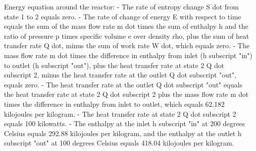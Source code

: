 Energy equation around the reactor:
- The rate of entropy change S dot from state 1 to 2 equals zero.
- The rate of change of energy E with respect to time equals the sum of the mass flow rate m dot times the sum of enthalpy h and the ratio of pressure p times specific volume e over density rho, plus the sum of heat transfer rate Q dot, minus the sum of work rate W dot, which equals zero.
- The mass flow rate m dot times the difference in enthalpy from inlet (h subscript "in") to outlet (h subscript "out"), plus the heat transfer rate at state 2 Q dot subscript 2, minus the heat transfer rate at the outlet Q dot subscript "out", equals zero.
- The heat transfer rate at the outlet Q dot subscript "out" equals the heat transfer rate at state 2 Q dot subscript 2 plus the mass flow rate m dot times the difference in enthalpy from inlet to outlet, which equals 62.182 kilojoules per kilogram.
- The heat transfer rate at state 2 Q dot subscript 2 equals 100 kilowatts.
- The enthalpy at the inlet h subscript "in" at 200 degrees Celsius equals 292.88 kilojoules per kilogram, and the enthalpy at the outlet h subscript "out" at 100 degrees Celsius equals 418.04 kilojoules per kilogram.